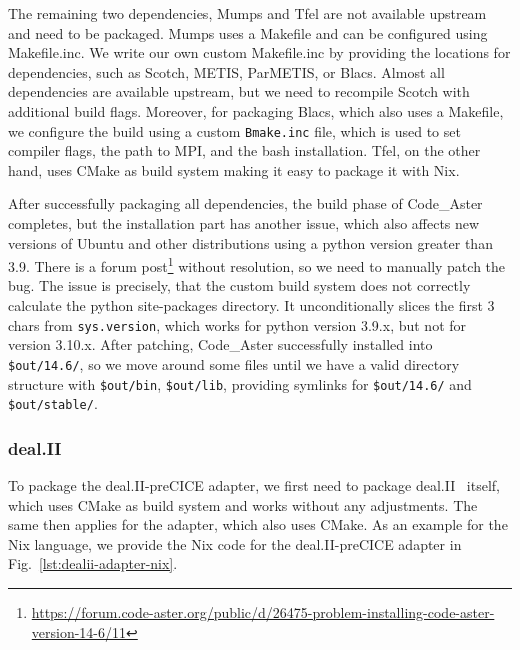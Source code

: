 \documentclass{eceasst}
\begin{document}
The remaining two dependencies, Mumps and Tfel are not available upstream and need to be packaged.
Mumps uses a Makefile and can be configured using Makefile.inc.
We write our own custom Makefile.inc by providing the locations for dependencies, such as Scotch, METIS, ParMETIS, or Blacs.
Almost all dependencies are available upstream, but we need to recompile Scotch with additional build flags.
Moreover, for packaging Blacs, which also uses a Makefile, we configure the build using a custom \texttt{Bmake.inc} file, which is used to set compiler flags, the path to MPI, and the bash installation.
Tfel, on the other hand, uses CMake as build system making it easy to package it with Nix.

After successfully packaging all dependencies, the build phase of Code\_Aster completes, but the installation part has another issue, which also affects new versions of Ubuntu and other distributions using a python version greater than 3.9.
There is a forum post\footnote{\url{https://forum.code-aster.org/public/d/26475-problem-installing-code-aster-version-14-6/11}} without resolution, so we need to manually patch the bug.
The issue is precisely, that the custom build system does not correctly calculate the python site-packages directory.
It unconditionally slices the first 3 chars from \texttt{sys.version}, which works for python version 3.9.x, but not for version 3.10.x.
After patching, Code\_Aster successfully installed into \texttt{\$out/14.6/}, so we move around some files until we have a valid directory structure with \texttt{\$out/bin}, \texttt{\$out/lib}, providing symlinks for \texttt{\$out/14.6/} and \texttt{\$out/stable/}.

\subsubsection{deal.II}


To package the deal.II-preCICE adapter, we first need to package deal.II~\cite{dealII95} itself, which uses CMake as build system and works without any adjustments.
The same then applies for the adapter, which also uses CMake.
As an example for the Nix language, we provide the Nix code for the deal.II-preCICE adapter in Fig.~\ref{lst:dealii-adapter-nix}.
\end{document}

